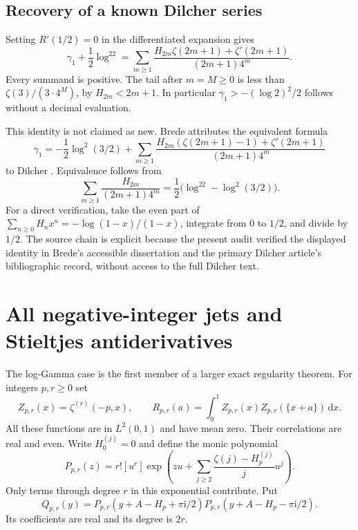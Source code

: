 \documentclass[11pt]{article}
\numberwithin{equation}{section}
\theoremstyle{definition}\newtheorem{definition}[theorem]{Definition}
\theoremstyle{remark}\newtheorem{remark}[theorem]{Remark}
\newcommand{\dd}{\,\mathrm d}
\newcommand{\iu}{\mathrm i}
\begin{document}
\subsection{Recovery of a known Dilcher series}
\label{sec:dilcher}

Setting $R'(1/2)=0$ in the differentiated expansion gives
\begin{equation}\label{eq:Dilcher}
 \gamma_1+\frac12\log^22
       =\sum_{m\ge1}\frac{H_{2m}\zeta(2m+1)+\zeta'(2m+1)}{(2m+1)4^m}.
\end{equation}
Every summand is positive. The tail after $m=M\ge0$ is less than
$\zeta(3)/(3\cdot4^M)$, by $H_{2m}<2m+1$.
In particular $\gamma_1>-(\log2)^2/2$ follows without a decimal
evaluation.

This identity is not claimed as new. Brede \cite[printed p.~16]{Brede}
attributes the equivalent formula
\begin{equation}\label{eq:Dilcheroriginal}
 \gamma_1=-\frac12\log^2(3/2)
 +\sum_{m\ge1}
 \frac{H_{2m}(\zeta(2m+1)-1)+\zeta'(2m+1)}{(2m+1)4^m}
\end{equation}
to Dilcher \cite{Dilcher}. Equivalence follows from
\[
 \sum_{m\ge1}\frac{H_{2m}}{(2m+1)4^m}
       =\frac12\bigl(\log^22-\log^2(3/2)\bigr).
\]
For a direct verification, take the even part of
$\sum_{n\ge0}H_nx^n=-\log(1-x)/(1-x)$, integrate from $0$ to $1/2$,
and divide by $1/2$. The source chain is explicit because the present
audit verified the displayed identity in Brede's accessible dissertation
and the primary Dilcher article's bibliographic record, without access
to the full Dilcher text.

\section{All negative-integer jets and Stieltjes antiderivatives}
\label{sec:alljets}

The log-Gamma case is the first member of a larger exact regularity
theorem. For integers $p,r\ge0$ set
\begin{equation}\label{eq:Zpr}
 Z_{p,r}(x)=\zeta^{(r)}(-p,x),\qquad
 R_{p,r}(a)=\int_0^1 Z_{p,r}(x)Z_{p,r}(\{x+a\})\dd x.
\end{equation}
All these functions are in $L^2(0,1)$ and have mean zero. Their
correlations are real and even. Write $H_0^{(j)}=0$ and define the monic
polynomial
\begin{equation}\label{eq:jetpolynomial}
 P_{p,r}(z)=r![u^r]\exp\left(zu+
                \sum_{j\ge2}\frac{\zeta(j)-H_p^{(j)}}j u^j\right).
\end{equation}
Only terms through degree $r$ in this exponential contribute. Put
\begin{equation}\label{eq:Qjetpolynomial}
 Q_{p,r}(y)=P_{p,r}(y+A-H_p+\pi\iu/2)
           P_{p,r}(y+A-H_p-\pi\iu/2).
\end{equation}
Its coefficients are real and its degree is $2r$.
\end{document}
